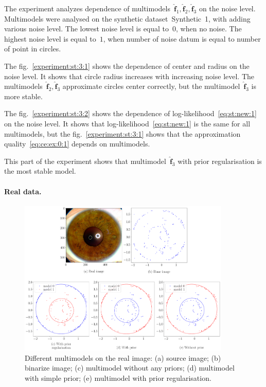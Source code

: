 \documentclass[12pt, twoside]{article}
\numberwithin{equation}{section}
\begin{document}
The experiment analyzes dependence of multimodels~$\hat{\mathbf{f}}_1, \hat{\mathbf{f}}_2, \hat{\mathbf{f}}_3$ on the noise level. 
Multimodels were analysed on the synthetic dataset~Synthetic~1, with adding various noise level.
The lowest noise level is equal to~$0$, when no noise. The highest noise level is equal to~$1$, when number of noise datum is equal to number of point in circles.

The fig.~\ref{experiment:st:3:1} shows the dependence of center and radius on the noise level. It shows that circle radius increases with increasing noise level. 
The multimodels~$\hat{\mathbf{f}}_2, \hat{\mathbf{f}}_3$ approximate circles center correctly, but the multimodel~$ \hat{\mathbf{f}}_3$ is more stable.

The fig.~\ref{experiment:st:3:2} shows the dependence of log-likelihood~\eqref{eq:st:new:1} on the noise level. 
It shows that log-likelihood~\eqref{eq:st:new:1} is the same for all multimodels, but the fig.~\ref{experiment:st:3:1} shows that the approximation quality~\eqref{eq:ce:ex:0:1} depends on multimodels.

This part of the experiment shows that multimodel~$\hat{\mathbf{f}}_3$ with prior regularisation is the most stable model.

\paragraph{Real data.}
\begin{figure}[h!t]\center
\includegraphics[width=0.9\textwidth]{result_eng/experiment_real_compare}
\caption{Different multimodels on the real image: (a) source image; (b) binarize image; (c) multimodel without any priors; (d) multimodel with simple prior; (e) multimodel with prior regularisation.}
\label{experiment:2}
\end{figure}
\end{document}
